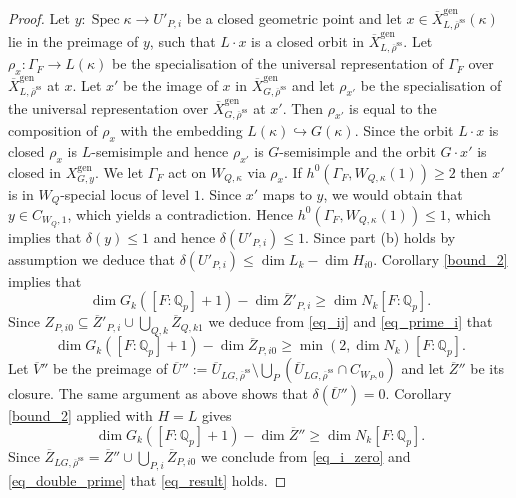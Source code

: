 \documentclass[10pt,a4paper]{amsart}
\newcommand{\Qp}{\mathbb {Q}_p}
\DeclareMathOperator{\Spec}{Spec}
\newcommand{\Ubar}{\overline{U}}
\newcommand{\Vbar}{\overline{{V}}}
\newcommand{\Xbar}{\overline{X}}
\newcommand{\Zbar}{\overline{Z}}
\newcommand{\gen}{\mathrm{gen}}
\newcommand{\rhobar}{\overline{\rho}}
\newcommand{\rhobarss}{\rhobar^{\mathrm{ss}}}
\begin{document}
\begin{proof}
 Let $y: \Spec \kappa\rightarrow U'_{P,i}$ be a closed geometric point  and let $x\in \Xbar^{\gen}_{L, \rhobarss}(\kappa)$ lie in the preimage of $y$, such that $L\cdot x$ is a closed orbit in $\Xbar^{\gen}_{L, \rhobarss}$. Let $\rho_x: \Gamma_F \rightarrow L(\kappa)$ be the 
 specialisation of the universal representation of $\Gamma_F$ over $\Xbar^{\gen}_{L, \rhobarss}$
 at $x$. Let $x'$ be the image of $x$ in $\Xbar^{\gen}_{G, \rhobarss}$ and let $\rho_{x'}$ 
 be the specialisation of the universal representation over $\Xbar^{\gen}_{G, \rhobarss}$
 at $x'$. Then $\rho_{x'}$ is equal to the composition of $\rho_x$ with the embedding
 $L(\kappa)\hookrightarrow G(\kappa)$. Since the orbit $L\cdot x$ is closed $\rho_x$ is 
 $L$-semisimple and hence $\rho_{x'}$ is $G$-semisimple and the orbit $G\cdot x'$ is 
 closed in $X^{\gen}_{G,y}$. We let $\Gamma_F$ act on $W_{Q, \kappa}$ via $\rho_x$. 
 If $h^0(\Gamma_F, W_{Q, \kappa}(1))\ge 2$ then $x'$ is in $W_{Q}$-special locus of level $1$. 
 Since $x'$ maps to $y$, we would obtain that $y\in C_{W_Q, 1}$, which yields a contradiction. 
 Hence $h^0(\Gamma_F, W_{Q, \kappa}(1))\le 1$, which implies that $\delta(y)\le 1$ and 
hence $\delta(U'_{P,i})\le 1$. Since  part (b) holds by assumption we deduce 
that $\delta(U'_{P,i})\le \dim L_k -\dim H_{i0}$. Corollary \ref{bound_2} implies that 
\begin{equation}\label{eq_prime_i}
\dim G_k([F:\Qp] +1) - \dim \Zbar'_{P,i} \ge \dim N_k [F:\Qp].
\end{equation}
Since $Z_{P, i0} \subseteq \Zbar'_{P,i} \cup \bigcup_{Q,k} \Zbar_{Q,k1}$ we deduce from \eqref{eq_ij} and \eqref{eq_prime_i} that 
\begin{equation}\label{eq_i_zero}
\dim G_k([F:\Qp] +1) - \dim \Zbar_{P,i0} \ge \min(2, \dim N_k)[F:\Qp].
\end{equation}
Let $\Vbar''$ be the preimage of $\Ubar'':= \Ubar_{LG, \rhobarss} \setminus \bigcup_P (\Ubar_{LG, \rhobarss}\cap C_{W_P,0})$ 
and let $\Zbar''$ be its closure. The same argument as above shows that $\delta(\Ubar'')=0$. Corollary 
\ref{bound_2} applied with $H=L$ gives
\begin{equation}\label{eq_double_prime} 
\dim G_k([F:\Qp] +1) - \dim \Zbar'' \ge \dim N_k [F:\Qp].
\end{equation}
Since $\Zbar_{LG, \rhobarss} = \Zbar''\cup \bigcup_{P,i} \Zbar_{P,i0}$ we conclude from \eqref{eq_i_zero} and
\eqref{eq_double_prime} that \eqref{eq_result} holds. 
\end{proof}
\end{document}
